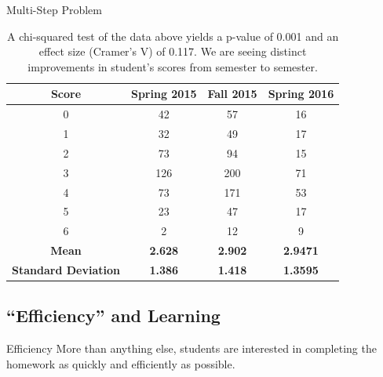 \documentclass[xcolor=x11names,compress]{beamer}
\begin{document}
\begin{frame}{Multi-Step Problem}
\begin{table}[ht]
  \caption{A chi-squared test of the data above yields a p-value of 0.001 and an effect size (Cramer's V) of 0.117. We are seeing distinct improvements in student's scores from semester to semester.}
  \begin{center}
    \begin{tabular}{|c|c|c|c|}
      \hline
      \textbf{Score} & \textbf{Spring 2015} & \textbf{Fall 2015} & \textbf{Spring 2016}\\
      \hline
      0 & 42 & 57 & 16\\
      \hline
      1 & 32 & 49 & 17\\
      \hline
      2 & 73 & 94 & 15\\
      \hline
      3 & 126 & 200 & 71\\
      \hline
      4 & 73 & 171 & 53\\
      \hline
      5 & 23 & 47 & 17\\
      \hline
      6 & 2 & 12 & 9\\
      \hline
      \textbf{Mean} & \textbf{2.628} & \textbf{2.902} & \textbf{2.9471}\\
      \hline
      \textbf{Standard Deviation} & \textbf{1.386} & \textbf{1.418} & \textbf{1.3595}\\
      \hline
    \end{tabular}
  \end{center}
  \label{tab:multi-step}
\end{table}
\end{frame}

\subsection{``Efficiency'' and Learning}

\begin{frame}{Efficiency}
	More than anything else, students are interested in completing the homework as quickly and efficiently as possible.
\end{frame}
\end{document}
